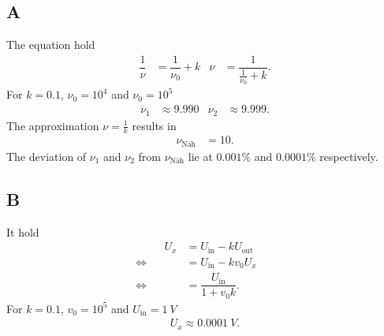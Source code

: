 \documentclass[a4paper,10pt]{article}
\numberwithin{equation}{section}
\begin{document}
\begin{multicols}{2}
        \subsection{A}
        The equation hold
        \begin{align} 
                \dfrac{1}{\nu }&=\dfrac{1}{\nu _0}+k&\nu &=\dfrac{1}{\tfrac{1}{\nu _0}+k}
        .\end{align} 
        For $k=0.1$, $\nu _0=10^4$ and $\nu _0=10^5$
        \begin{align} 
                \nu _1&\approx 9.990 & \nu _2&\approx 9.999
        .\end{align} 
        The approximation $\nu =\tfrac{1}{k}$ results in
        \begin{align} 
                \nu _\text{Näh}&=10
        .\end{align} 
        The deviation of $\nu _1$ and $\nu _2$ from $\nu _\text{Näh}$ lie at $0.001\%$ and $0.0001\%$ respectively.

        \subsection{B}
        It hold
        \begin{align} 
                &&&& U_x &= U_\text{in}-kU_\text{out} &&&& \\
                &&\Leftrightarrow && &= U_\text{in}-kv_0U_x &&&&\nonumber \\
                &&\Leftrightarrow && &= \dfrac{U_\text{in}}{1+v_0k}. &&&&
        \end{align} 
        For $k=0.1$, $v_0=10^5$ and $U_\text{in}=\SI{1}{V}$
        \begin{align} 
                U_x\approx \SI{0.0001}{V}
        .\end{align} 


\end{multicols}
\end{document}
